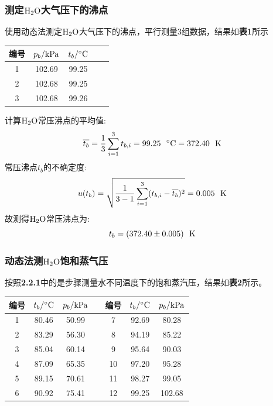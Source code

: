 \documentclass[12pt]{article}
\begin{document}
		 	\subsubsection{测定$\rm H_{2}O$大气压下的沸点}
			 使用动态法测定$\rm H_{2}O$大气压下的沸点，平行测量3组数据，结果如\textbf{表1}所示\par
			 \begin{table}[h]
				\centering
				\begin{tabular}{ccccc}
					\toprule
					编号 & $p_{b}/{\rm kPa}$& $t_{b}/{\rm ^{\circ}C}$ \\
					\midrule
					1 & 102.69 & 99.25\\
					2 & 102.68 & 99.25\\
					3 & 102.68 & 99.26\\
					\bottomrule
				\end{tabular}
			\end{table}
			\par
			计算$\rm H_{2}O$常压沸点的平均值:
			$$
				\overline{t_{b}}=\frac{1}{3}\sum_{i=1}^{3}t_{b,i}=99.25\ \ {\rm ^{\circ}C}= 372.40\ \ {\rm K}
			$$
			常压沸点$t_{b}$的不确定度:
			$$
				u(t_{b})=\sqrt{\frac{1}{3-1}\sum_{i=1}^{3}(t_{b,i}-\overline{t_{b}})^{2}}=0.005\ \ {\rm K}
			$$
			故测得$\rm H_{2}O$常压沸点为:
			$$
				t_{b}=(372.40\pm 0.005)\ \ {\rm K}
			$$
			\par
 			\subsubsection{动态法测$\rm H_{2}O$饱和蒸气压}
			按照\textbf{2.2.1}中的是步骤测量水不同温度下的饱和蒸汽压，结果如\textbf{表2}所示。
			\begin{table}[h]
				\centering
				\begin{tabular}{ccccccc}
					\toprule
					编号 & $t_{b}/{\rm ^{\circ}C}$& $p_{b}/{\rm kPa}$ &&编号 & $t_{b}/{\rm ^{\circ}C}$ & $p_{b}/{\rm kPa}$  \\
					\midrule
					1  & 80.46 & 50.99 &&7& 92.69 & 80.28\\
					2  & 83.29 & 56.30 &&8& 94.19 & 85.22 \\
					3  & 85.04 & 60.14 &&9& 95.64 & 90.03\\
					4  & 87.09 & 65.35 &&10& 97.20 & 95.28  \\
					5  & 89.15 & 70.61 &&11& 98.27 & 99.05 \\
					6  & 90.92 & 75.41 &&12& 99.25 & 102.68 \\
					\bottomrule
				\end{tabular}
			\end{table}
\end{document}
